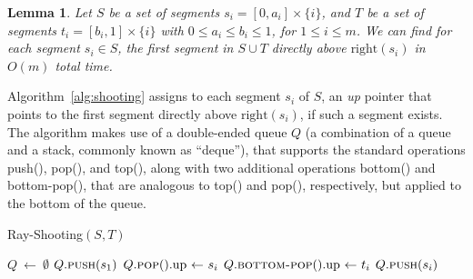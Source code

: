 \documentclass[12pt]{dalthesis}
\def\favoritefont{\bfseries \sffamily}
\def\QED{\ensuremath{{\Box}}}
\def\markatright#1{\leavevmode\unskip\nobreak\quad\hspace*{\fill}{#1}}
\newenvironment{proof}
	{\begin{trivlist}\item[\hskip\labelsep{\favoritefont Proof:}]}
	{\markatright{\QED}\end{trivlist}}
\newtheorem{lemma}[theorem]{Lemma}
\newcommand{\lee}{\leqslant}
\newcommand{\gee}{\geqslant}
\newcommand{\set}[1]{{\{ #1 \}}}
\newcommand{\eq}{{\ \leftarrow\ }}
\newcommand{\Right}{\mbox{right}}
\newcommand{\up}{\text{up}}
\begin{document}
\begin{lemma} \label{lemma:shooting}
	Let $S$ be a set of segments
	$s_i = [0,a_i] \times \set{i}$, and 
	$T$ be a set of segments $t_i = [b_i, 1] \times \set{i}$
	with $0 \lee a_i \lee b_i \lee 1$, for $1 \lee i \lee m$. 
	We can find for each segment $s_i \in S$, the first segment in $S \cup T$ 
	directly above $\Right(s_i)$ in $O(m)$ total time.
\end{lemma}


\begin{proof}
	Algorithm~\ref{alg:shooting} assigns to each segment $s_i$ of $S$,
	an \emph{up} pointer that points to the first segment directly above $\Right(s_i)$,
	if such a segment exists. 
	The algorithm makes use of a double-ended queue $Q$ 
	(a combination of a queue and a stack, commonly known as ``deque''),
	that supports the standard operations
	{\sc push}(), {\sc pop}(), and {\sc top}(),
	along with two additional operations
	{\sc bottom}() and {\sc bottom-pop}(), that are analogous to
	{\sc top}() and {\sc pop}(), respectively,
	but applied to the bottom of the queue.


\begin{algorithm} [h]
\caption {\sc Ray-Shooting$(S,T)$} \label{alg:shooting}
\begin{algorithmic}[1]
	\vspace{0.5em}
	\baselineskip
	\STATE $Q \eq \emptyset$
	\STATE $Q.\mbox{\sc push}(s_1)$
		\WHILE {$|Q.\mbox{\sc top}()| \lee |s_i| $}  \label{l:w1-1}
			\STATE $Q.\mbox{\sc pop}().\up \eq s_i$ \label{l:w1-2}
		\ENDWHILE 
		\WHILE {$|Q.\mbox{\sc bottom}()| \gee 1-|t_i| $}  \label{l:w2-1}
			\STATE $Q.\mbox{\sc bottom-pop}().\up \eq t_i$ \label{l:w2-2}
		\ENDWHILE 
		\STATE $Q.\mbox{\sc push}(s_i)$
	\ENDFOR 
\end{algorithmic}
\end{algorithm}
	

\end{proof}
\end{document}
